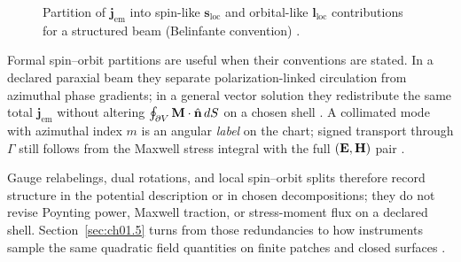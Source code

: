 \begin{figure}[!htbp]
\centering
{}
\caption{Partition of $\mathbf{j}_{\mathrm{em}}$ into spin-like $\mathbf{s}_{\mathrm{loc}}$ and orbital-like $\mathbf{l}_{\mathrm{loc}}$ contributions for a structured beam (Belinfante convention) \cite{belinfante1940,allen1992}.}
\label{fig:ch1.spin-orbit-decomposition}
\end{figure}

Formal spin--orbit partitions are useful when their conventions are stated. In a declared paraxial beam they separate polarization-linked circulation from azimuthal phase gradients; in a general vector solution they redistribute the same total $\mathbf{j}_{\mathrm{em}}$ without altering $\oint_{\partial V}\mathbf{M}\cdot\hat{\mathbf{n}}\,dS$ on a chosen shell \cite{belinfante1940,allen1992,stratton1941}. A collimated mode with azimuthal index $m$ is an angular \emph{label} on the chart; signed transport through $\Gamma$ still follows from the Maxwell stress integral with the full $(\mathbf{E},\mathbf{H})$ pair \cite{allen1992,stratton1941}.

Gauge relabelings, dual rotations, and local spin--orbit splits therefore record structure in the potential description or in chosen decompositions; they do not revise Poynting power, Maxwell traction, or stress-moment flux on a declared shell. Section~\ref{sec:ch01.5} turns from those redundancies to how instruments sample the same quadratic field quantities on finite patches and closed surfaces \cite{poynting1884,beth1936,stratton1941}.

